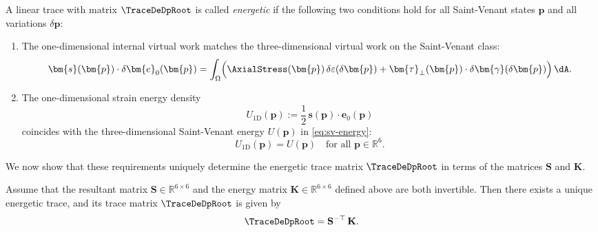 \begin{definition}
A linear trace with matrix $\TraceDeDpRoot$ is called \emph{energetic} if the
following two conditions hold for all Saint-Venant states $\bm{p}$ and all
variations $\delta\bm{p}$:
\begin{enumerate}
  \item The one-dimensional internal virtual work matches the three-dimensional
        virtual work on the Saint-Venant class:
        \begin{equation}
        \bm{s}(\bm{p})\cdot \delta\bm{e}_0(\bm{p})
        =
        \int_\Omega \Bigl(
        \AxialStress(\bm{p})\,\delta\varepsilon(\delta\bm{p})
        +
        \bm{\tau}_\perp(\bm{p})\cdot\delta\bm{\gamma}(\delta\bm{p})
        \Bigr)\,\dA.
        \label{eq:ener-virtual-work}
        \end{equation}
  \item The one-dimensional strain energy density
        \begin{equation}
        U_{\mathrm{1D}}(\bm{p})
        :=
        \frac{1}{2}\,\bm{s}(\bm{p})\cdot \bm{e}_0(\bm{p})
        \end{equation}
        coincides with the three-dimensional Saint-Venant energy
        $U(\bm{p})$ in \eqref{eq:sv-energy}:
        \begin{equation}
        U_{\mathrm{1D}}(\bm{p}) = U(\bm{p})
        \quad\text{for all }\bm{p}\in\mathbb{R}^6.
        \label{eq:ener-energy-equality}
        \end{equation}
\end{enumerate}
\end{definition}

We now show that these requirements uniquely determine the energetic trace
matrix $\TraceDeDpRoot$ in terms of the matrices $\mathbf{S}$ and $\mathbf{K}$.

\begin{proposition}
\label{prop:energetic-T0}
Assume that the resultant matrix $\mathbf{S}\in\mathbb{R}^{6\times 6}$ and the
energy matrix $\mathbf{K}\in\mathbb{R}^{6\times 6}$ defined above are both
invertible. 
Then there exists a unique energetic trace, and its trace matrix
$\TraceDeDpRoot$ is given by
\begin{equation}
\TraceDeDpRoot
=
\mathbf{S}^{-\top}\,\mathbf{K}.
\label{eq:T0-energetic}
\end{equation}
\end{proposition}


